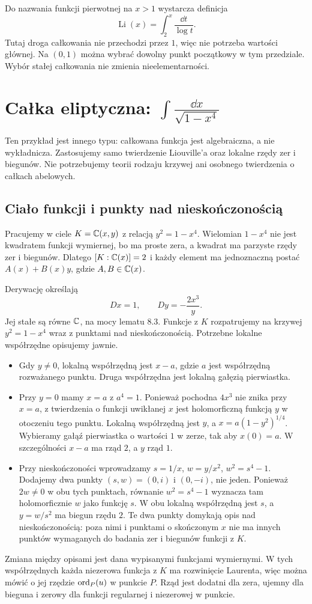 Do nazwania funkcji pierwotnej na $x>1$ wystarcza definicja
\[
\operatorname{Li}(x)=\int_2^x\frac{\dd t}{\log t}.
\]
Tutaj droga całkowania nie przechodzi przez $1$, więc nie potrzeba wartości głównej. Na $(0,1)$ można wybrać dowolny punkt początkowy w tym przedziale. Wybór stałej całkowania nie zmienia nieelementarności.

\section{Całka eliptyczna: $\int \frac{\dd x}{\sqrt{1-x^4}}$}

Ten przykład jest innego typu: całkowana funkcja jest algebraiczna, a nie wykładnicza. Zastosujemy samo twierdzenie Liouville'a oraz lokalne rzędy zer i biegunów. Nie potrzebujemy teorii rodzaju krzywej ani osobnego twierdzenia o całkach abelowych.

\subsection{Ciało funkcji i punkty nad nieskończonością}

Pracujemy w ciele $K=\mathbb{C}(x,y)$ z relacją $y^2=1-x^4$. Wielomian $1-x^4$ nie jest kwadratem funkcji wymiernej, bo ma proste zera, a kwadrat ma parzyste rzędy zer i biegunów. Dlatego $[K:\mathbb{C}(x)]=2$ i każdy element ma jednoznaczną postać $A(x)+B(x)y$, gdzie $A,B\in\mathbb{C}(x)$.

Derywację określają
\[
Dx=1,\qquad Dy=-\frac{2x^3}{y}.
\]
Jej stałe są równe $\mathbb{C}$, na mocy lematu 8.3. Funkcje z $K$ rozpatrujemy na krzywej $y^2=1-x^4$ wraz z punktami nad nieskończonością. Potrzebne lokalne współrzędne opisujemy jawnie.
\begin{itemize}
\item Gdy $y\ne0$, lokalną współrzędną jest $x-a$, gdzie $a$ jest współrzędną rozważanego punktu. Druga współrzędna jest lokalną gałęzią pierwiastka.
\item Przy $y=0$ mamy $x=a$ z $a^4=1$. Ponieważ pochodna $4x^3$ nie znika przy $x=a$, z twierdzenia o funkcji uwikłanej $x$ jest holomorficzną funkcją $y$ w otoczeniu tego punktu. Lokalną współrzędną jest $y$, a $x=a(1-y^2)^{1/4}$. Wybieramy gałąź pierwiastka o wartości $1$ w zerze, tak aby $x(0)=a$. W szczególności $x-a$ ma rząd $2$, a $y$ rząd $1$.
\item Przy nieskończoności wprowadzamy $s=1/x$, $w=y/x^2$, $w^2=s^4-1$. Dodajemy dwa punkty $(s,w)=(0,i)$ i $(0,-i)$, nie jeden. Ponieważ $2w\ne0$ w obu tych punktach, równanie $w^2=s^4-1$ wyznacza tam holomorficznie $w$ jako funkcję $s$. W obu lokalną współrzędną jest $s$, a $y=w/s^2$ ma biegun rzędu $2$. Te dwa punkty domykają opis nad nieskończonością: poza nimi i punktami o skończonym $x$ nie ma innych punktów wymaganych do badania zer i biegunów funkcji z $K$.
\end{itemize}
Zmiana między opisami jest dana wypisanymi funkcjami wymiernymi. W tych współrzędnych każda niezerowa funkcja z $K$ ma rozwinięcie Laurenta, więc można mówić o jej rzędzie $\operatorname{ord}_P(u)$ w punkcie $P$. Rząd jest dodatni dla zera, ujemny dla bieguna i zerowy dla funkcji regularnej i niezerowej w punkcie.


